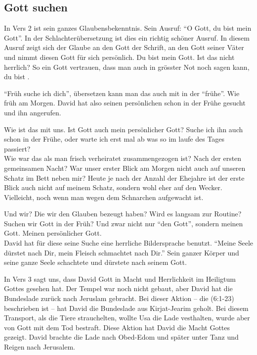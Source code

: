\documentclass[14pt]{../../inc/mybib}
\begin{document}
    \subsection{Gott suchen}
    \begin{block}
    In Vers 2 ist sein ganzes Glaubensbekenntnis. Sein Ausruf: \enquote{O Gott, du bist mein Gott}. In der Schlachterübersetzung ist dies ein richtig schöner Ausruf. In diesem Ausruf zeigt sich der Glaube an den Gott der Schrift, an den Gott seiner Väter und nimmt diesen Gott für sich persönlich. Du bist mein Gott. Ist das nicht herrlich? So ein Gott vertrauen, dass man auch in grösster Not noch sagen kann, du bist . 

    \enquote{Früh suche ich dich}, übersetzen kann man das auch mit in der \enquote{frühe}. Wie früh am Morgen. David hat also seinen persönlichen schon in der Frühe gesucht und ihn angerufen.
    \end{block}
    \begin{block}
        Wie ist das mit uns. Ist Gott auch mein persönlicher Gott? Suche ich ihn auch schon in der Frühe, oder warte ich erst mal ab was so im laufe des Tages passiert?\\
        Wie war das als man frisch verheiratet zusammengezogen ist? Nach der ersten gemeinsamen Nacht? War unser erster Blick am Morgen nicht auch auf unseren Schatz im Bett neben mir? Heute je nach der Anzahl der Ehejahre ist der erste Blick auch nicht auf meinem Schatz, sondern wohl eher auf den Wecker. Vielleicht, noch wenn man wegen dem Schnarchen aufgewacht ist.

        Und wir? Die wir den Glauben bezeugt haben? Wird es langsam zur Routine? Suchen wir Gott in der Früh? Und zwar nicht nur \enquote{den Gott}, sondern meinen Gott. Meinen persönlicher Gott.\\

        David hat für diese seine Suche eine herrliche Bildersprache benutzt. \enquote{Meine Seele dürstet nach Dir, mein Fleisch schmachtet nach Dir.} Sein ganzer Körper und seine ganze Seele schachtete und dürstete nach seinem Gott.       

    \end{block}
    \begin{block}
        In Vers 3 sagt uns, dass David Gott in Macht und Herrlichkeit im Heiligtum Gottes gesehen hat. Der Tempel war noch nicht gebaut, aber David hat die Bundeslade zurück nach Jeruslam gebracht. Bei dieser Aktion -- die (6:1-23) beschrieben ist -- hat David die Bundeslade aus Kirjat-Jearim geholt. Bei diesem Transport, als die Tiere strauchelten, wollte Usa die Lade vesthalten, wurde aber von Gott mit dem Tod bestraft. Diese Aktion hat David die Macht Gottes gezeigt. David brachte die Lade nach Obed-Edom und später unter Tanz und Reigen nach Jerusalem.
    \end{block}
\end{document}
